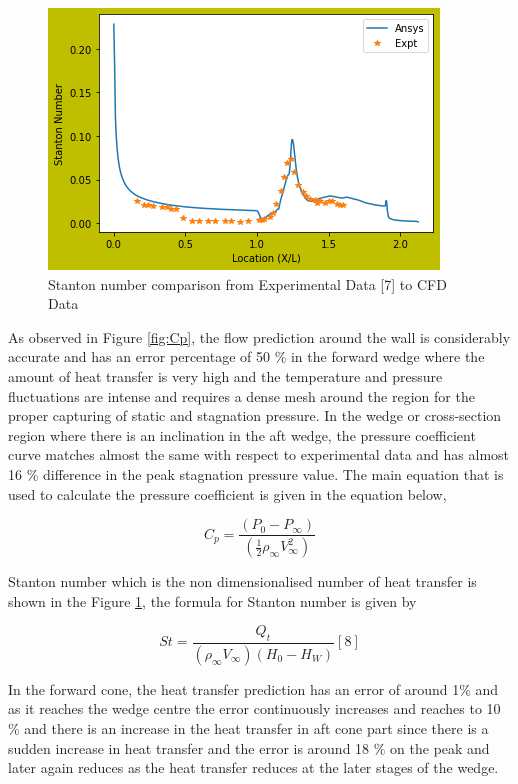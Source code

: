 \begin{figure}[ht]
\centering
  \includegraphics[width=0.6\linewidth]{images/Stanton Number.png}
  \caption{Stanton number comparison from Experimental Data [7] to CFD Data}
  \label{fig:Stanton_number}
\end{figure}

As observed in Figure \ref{fig:Cp}, the flow prediction around the wall is considerably accurate and has an error percentage of 50 \% in the forward wedge where the amount of heat transfer is very high and the temperature and pressure fluctuations are intense and requires a dense mesh around the region for the proper capturing of static and stagnation pressure. In the wedge or cross-section region where there is an inclination in the aft wedge, the pressure coefficient curve matches almost the same with respect to experimental data and has almost 16 \% difference in the peak stagnation pressure value. The main equation that is used to calculate the pressure coefficient is given in the equation below,

\[C_p = \frac{(P_0 - P_{\infty})}{(\frac{1}{2} \rho_{\infty} V_{\infty}^2)} \]

Stanton number which is the non dimensionalised number of heat transfer is shown in the Figure \ref{fig:Stanton_number}, the formula for Stanton number is given by 

\[St = \frac{Q_t}{( \rho_{\infty} V_{\infty}) (H_0 - H_W)}      [8] \] 

In the forward cone, the heat transfer prediction has an error of around 1\% and as it reaches the wedge centre the error continuously increases and reaches to 10 \% and there is an increase in the heat transfer in aft cone part since there is a sudden increase in heat transfer and the error is around 18 \% on the peak and later again reduces as the heat transfer reduces at the later stages of the wedge.